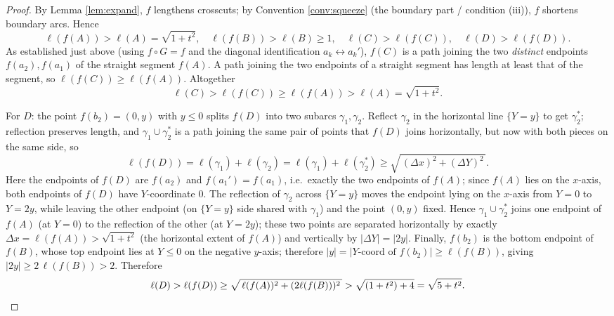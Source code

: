 \documentclass[12pt]{article}
\begin{document}
\begin{proof}
By Lemma \ref{lem:expand}, $f$ lengthens crosscuts; by Convention
\ref{conv:squeeze} (the boundary part / condition (iii)), $f$ shortens
boundary arcs. Hence
\[
\ell(f(A))>\ell(A)=\sqrt{1+t^2},\quad
\ell(f(B))>\ell(B)\ge1,\quad
\ell(C)>\ell(f(C)),\quad \ell(D)>\ell(f(D)).
\]
As established just above (using $f\circ G=f$ and the diagonal
identification $a_k\!\leftrightarrow\!a_k'$), $f(C)$ is a path joining the
two \emph{distinct} endpoints $f(a_2),f(a_1)$ of the straight segment
$f(A)$. A path joining the two endpoints of a straight segment has length
at least that of the segment, so $\ell(f(C))\ge\ell(f(A))$. Altogether
\[
\ell(C)>\ell(f(C))\ge\ell(f(A))>\ell(A)=\sqrt{1+t^2}.
\]

For $D$: the point $f(b_2)=(0,y)$ with $y\le0$ splits $f(D)$ into two
subarcs $\gamma_1,\gamma_2$. Reflect $\gamma_2$ in the horizontal line
$\{Y=y\}$ to get $\gamma_2^*$; reflection preserves length, and
$\gamma_1\cup\gamma_2^*$ is a path joining the same pair of points that
$f(D)$ joins horizontally, but now with both pieces on the same side, so
\[
\ell(f(D))=\ell(\gamma_1)+\ell(\gamma_2)
=\ell(\gamma_1)+\ell(\gamma_2^*)
\ge\sqrt{\,(\Delta x)^2+(\Delta Y)^2\,}.
\]
Here the endpoints of $f(D)$ are $f(a_2)$ and $f(a_1')=f(a_1)$, i.e.\
exactly the two endpoints of $f(A)$; since $f(A)$ lies on the $x$-axis,
both endpoints of $f(D)$ have $Y$-coordinate $0$. The reflection of
$\gamma_2$ across $\{Y=y\}$ moves the endpoint lying on the $x$-axis from
$Y=0$ to $Y=2y$, while leaving the other endpoint (on $\{Y=y\}$ side
shared with $\gamma_1$) and the point $(0,y)$ fixed. Hence
$\gamma_1\cup\gamma_2^*$ joins one endpoint of $f(A)$ (at $Y=0$) to the
reflection of the other (at $Y=2y$); these two points are separated
horizontally by exactly $\Delta x=\ell(f(A))>\sqrt{1+t^2}$ (the horizontal
extent of $f(A)$) and vertically by $|\Delta Y|=|2y|$. Finally, $f(b_2)$
is the bottom endpoint of $f(B)$, whose top endpoint lies at $Y\le0$ on
the negative $y$-axis; therefore $|y|=|Y\text{-coord of }f(b_2)|\ge
\ell(f(B))$, giving $|2y|\ge 2\,\ell(f(B))>2$. Therefore
\[
\ell(D)>\ell(f(D))\ge\sqrt{\,\ell(f(A))^2+(2\ell(f(B)))^2\,}
>\sqrt{(1+t^2)+4}=\sqrt{5+t^2}. \qedhere
\]
\end{proof}
\end{document}
